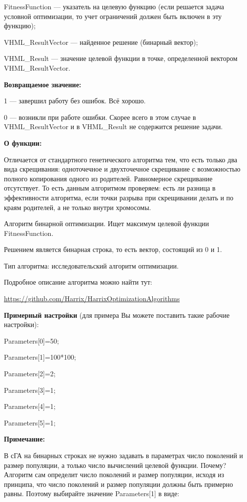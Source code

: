 FitnessFunction --- указатель на целевую функцию (если решается задача условной оптимизации, то учет ограничений должен быть включен в эту функцию);
 
VHML\_ResultVector --- найденное решение (бинарный вектор);
 
VHML\_Result --- значение целевой функции в точке, определенной вектором VHML\_ResultVector.

\textbf{Возвращаемое значение:} 

 1 --- завершил работу без ошибок. Всё хорошо.
 
 0 --- возникли при работе ошибки. Скорее всего в этом случае в VHML\_ResultVector и в VHML\_Result не содержится решение задачи.

\textbf{О функции:}

Отличается от стандартного генетического алгоритма тем, что есть только два вида скрещивания: одноточечное и двухточечное скрещивание с возможностью полного копирования одного из родителей. Равномерное скрещивание отсутствует. То есть данным алгоритмом проверяем: есть ли разница в эффективности алгоритма, если точки разрыва при скрещивании делать и по краям родителей, а не только внутри хромосомы.

Алгоритм бинарной оптимизации. Ищет максимум целевой функции FitnessFunction.

Решением является бинарная строка, то есть вектор, состоящий из 0 и 1.

Тип алгоритма: исследовательский алгоритм оптимизации.

Подробное описание алгоритма можно найти тут:

\href{https://github.com/Harrix/HarrixOptimizationAlgorithms/blob/master/\_HarrixOptimizationAlgorithms.pdf}{https://github.com/Harrix/HarrixOptimizationAlgorithms}


\textbf{Примерный настройки} (для примера Вы можете поставить такие рабочие настройки):

 Parameters[0]=50;
 
Parameters[1]=100*100;

Parameters[2]=2;

Parameters[3]=1;

Parameters[4]=1;

Parameters[5]=1;


\textbf{Примечание:}

 В сГА на бинарных строках не нужно задавать в параметрах число поколений и размер популяции, а только число вычислений целевой функции. Почему? Алгоритм сам определит число поколений и размер популяции, исходя из принципа, что число поколений и размер популяции должны быть примерно равны. Поэтому выбирайте значение Parameters[1] в виде:

